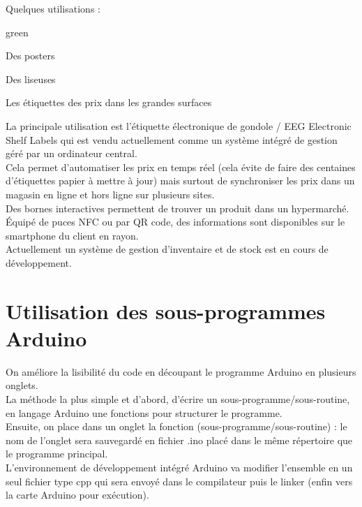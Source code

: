 

Quelques utilisations : \\
\begin{items}{green}{\Bullet}
    \item Des posters
    \item Des liseuses
    \item Les étiquettes des prix dans les grandes surfaces
\end{items}


La principale utilisation est l'étiquette électronique de gondole / EEG Electronic Shelf Labels 
qui est vendu actuellement comme un système intégré de gestion géré par un ordinateur central.\\
Cela permet d'automatiser les prix en temps réel (cela évite de faire des centaines d'étiquettes 
papier à mettre à jour) mais surtout de synchroniser les prix dans un magasin en ligne et 
hors ligne sur plusieurs sites.\\ 
Des bornes interactives permettent de trouver un produit dans un hypermarché.\\
Équipé de puces NFC ou par QR code, des informations sont disponibles sur le smartphone du client 
en rayon.\\
Actuellement un système de gestion d'inventaire et de stock est en cours de développement.


\chapter{Utilisation des sous-programmes Arduino}

On améliore la lisibilité du code en découpant le programme Arduino en plusieurs onglets. \\
La méthode la plus simple et d'abord, d'écrire un sous-programme/sous-routine, en langage 
Arduino une fonctions pour structurer le programme.\\ 
Ensuite, on place dans un onglet la fonction (sous-programme/sous-routine) : le nom de 
l'onglet sera sauvegardé en fichier .ino placé dans le même répertoire que le programme principal.\\

L'environnement de développement intégré  Arduino va modifier l'ensemble en 
un seul fichier type cpp qui sera envoyé dans le compilateur puis le linker 
(enfin vers la carte Arduino pour exécution).

